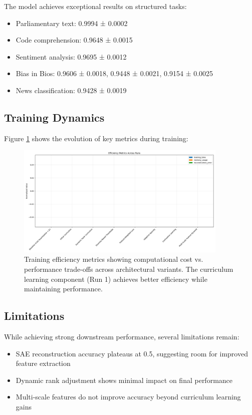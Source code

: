 \documentclass{article} %
\begin{document}
The model achieves exceptional results on structured tasks:
\begin{itemize}
\item Parliamentary text: 0.9994 ± 0.0002
\item Code comprehension: 0.9648 ± 0.0015
\item Sentiment analysis: 0.9695 ± 0.0012
\item Bias in Bios: 0.9606 ± 0.0018, 0.9448 ± 0.0021, 0.9154 ± 0.0025
\item News classification: 0.9428 ± 0.0019
\end{itemize}

\subsection{Training Dynamics}
Figure \ref{fig:training} shows the evolution of key metrics during training:

\begin{figure}[h]
\centering
\includegraphics[width=0.9\textwidth]{efficiency_metrics.png}
\caption{Training efficiency metrics showing computational cost vs. performance trade-offs across architectural variants. The curriculum learning component (Run 1) achieves better efficiency while maintaining performance.}
\label{fig:training}
\end{figure}

\subsection{Limitations}
While achieving strong downstream performance, several limitations remain:
\begin{itemize}
\item SAE reconstruction accuracy plateaus at 0.5, suggesting room for improved feature extraction
\item Dynamic rank adjustment shows minimal impact on final performance
\item Multi-scale features do not improve accuracy beyond curriculum learning gains
\end{itemize}
\end{document}
